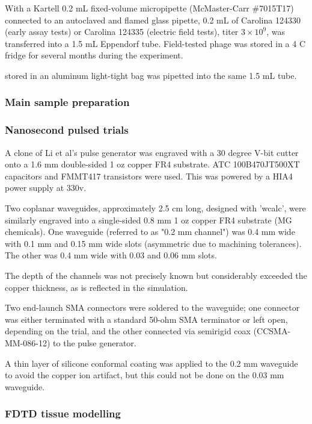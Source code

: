 \documentclass[paper.tex]{subfiles}
\begin{document}
\begin{multicols}{1}
With a Kartell 0.2 mL fixed-volume micropipette (McMaster-Carr \#7015T17) connected to an autoclaved and flamed glass pipette,  0.2 mL of Carolina 124330 (early assay tests) or Carolina 124335 (electric field tests), titer $3\times10^9$, was transferred into a 1.5 mL Eppendorf tube. Field-tested phage was stored in a 4 C fridge for several months during the experiment.

 stored in an aluminum light-tight bag was pipetted into the same 1.5 mL tube.

\subsubsection{Main sample preparation}

\subsubsection{Nanosecond pulsed trials}

A clone of Li et al's pulse generator was engraved with a 30 degree V-bit cutter onto a 1.6 mm double-sided 1 oz copper FR4 substrate. ATC 100B470JT500XT capacitors and FMMT417 transistors were used. This was powered by a HIA4 power supply at 330v.

Two coplanar waveguides, approximately 2.5 cm long, designed with 'wcalc'\cite{Wcalc}, were similarly engraved into a single-sided 0.8 mm 1 oz copper FR4 substrate (MG chemicals). One waveguide (referred to as "0.2 mm channel") was 0.4 mm wide with 0.1 mm and 0.15 mm wide slots (asymmetric due to machining tolerances). The other was 0.4 mm wide with 0.03 and 0.06 mm slots. 

The depth of the channels was not precisely known but considerably exceeded the copper thickness, as is reflected in the simulation.

Two end-launch SMA connectors were soldered to the waveguide; one connector was either terminated with a standard 50-ohm SMA terminator or left open, depending on the trial, and the other connected via semirigid coax (CCSMA-MM-086-12) to the pulse generator.

\conclusiongrad 

A thin layer of silicone conformal coating was applied to the 0.2 mm waveguide to avoid the copper ion artifact, but this could not be done on the 0.03 mm waveguide.







\subsubsection{FDTD tissue modelling}


\end{multicols}
\end{document}
